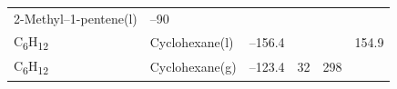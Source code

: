 \documentclass[
  9pt,
]{extbook}
\theoremstyle{definition}
\theoremstyle{definition}
\theoremstyle{definition}
\theoremstyle{remark}
\begin{document}
\begin{longtable}[]{@{}llllll@{}}
\begin{minipage}[t]{0.17\columnwidth}
2-Methyl--1-pentene(l)\strut
\end{minipage} & \begin{minipage}[t]{0.15\columnwidth}\raggedright
--90\strut
\end{minipage} & \begin{minipage}[t]{0.15\columnwidth}\raggedright
\strut
\end{minipage} & \begin{minipage}[t]{0.14\columnwidth}\raggedright
\strut
\end{minipage} & \begin{minipage}[t]{0.14\columnwidth}\raggedright
\strut
\end{minipage}\tabularnewline
\begin{minipage}[t]{0.07\columnwidth}\raggedright
C\textsubscript{6}H\textsubscript{12}\strut
\end{minipage} & \begin{minipage}[t]{0.17\columnwidth}\raggedright
Cyclohexane(l)\strut
\end{minipage} & \begin{minipage}[t]{0.15\columnwidth}\raggedright
--156.4\strut
\end{minipage} & \begin{minipage}[t]{0.15\columnwidth}\raggedright
\strut
\end{minipage} & \begin{minipage}[t]{0.14\columnwidth}\raggedright
\strut
\end{minipage} & \begin{minipage}[t]{0.14\columnwidth}\raggedright
154.9\strut
\end{minipage}\tabularnewline
\begin{minipage}[t]{0.07\columnwidth}\raggedright
C\textsubscript{6}H\textsubscript{12}\strut
\end{minipage} & \begin{minipage}[t]{0.17\columnwidth}\raggedright
Cyclohexane(g)\strut
\end{minipage} & \begin{minipage}[t]{0.15\columnwidth}\raggedright
--123.4\strut
\end{minipage} & \begin{minipage}[t]{0.15\columnwidth}\raggedright
32\strut
\end{minipage} & \begin{minipage}[t]{0.14\columnwidth}\raggedright
298\strut
\end{minipage} & \begin{minipage}[t]{0.14\columnwidth}\raggedright

\end{minipage}
\end{longtable}
\end{document}
